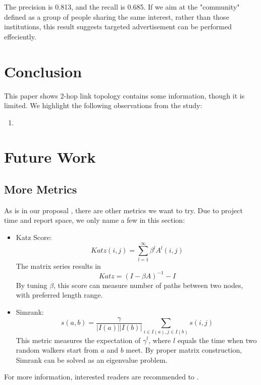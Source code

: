 \documentclass[11pt,a4paper]{article}
\begin{document}
The precision is 0.813, and the recall is 0.685. 
If we aim at the "community" defined as a group 
of people sharing the same interest, rather than 
those institutions, this result suggests targeted 
advertisement can be performed effeciently. 


\section{Conclusion}

This paper shows 2-hop link topology contains some information, 
though it is limited. We highlight the following 
observations from the study:
\begin{enumerate}
	\item 
\end{enumerate}

\section{Future Work}

\subsection{More Metrics}

As is in our proposal \cite{hu2011-cd2hop}, there are other metrics
we want to try. Due to project time and report space, we only name 
a few in this section:
\begin{itemize}
	\item Katz Score:
			\begin{equation}
				Katz(i,j)=\sum_{l=1}^{\infty}{\beta^lA^l(i,j)}
			\end{equation}
			The matrix series results in 
			\begin{equation}
				Katz = (I-\beta A)^{-1} - I
			\end{equation}
			By tuning $\beta$, this score can measure number of paths between 
			two nodes, with preferred length range. 
	\item Simrank:
			\begin{equation}
				s(a,b)=\frac{\gamma}{|I(a)||I(b)|}
				\sum_{i \in I(a), j \in I(b)} s(i,j)
			\end{equation}
			This metric measures the expectation of $\gamma^l$, where $l$ equals 
			the time when two random walkers start from $a$ and $b$ meet. By proper 
			matrix construction, Simrank can be solved as an eigenvalue problem. 
\end{itemize}
For more information, interested readers are recommended to \cite{aggarwal2011social}. 
\end{document}
